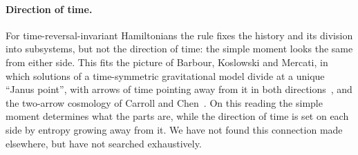 \documentclass[11pt]{article}
\theoremstyle{definition}
\theoremstyle{remark}
\begin{document}
\paragraph{Direction of time.} For time-reversal-invariant Hamiltonians the rule fixes the history and its division into subsystems, but not the direction of time: the simple moment looks the same from either side. This fits the picture of Barbour, Koslowski and Mercati, in which solutions of a time-symmetric gravitational model divide at a unique ``Janus point'', with arrows of time pointing away from it in both directions~\cite{BKM2014}, and the two-arrow cosmology of Carroll and Chen~\cite{CarrollChen2004}. On this reading the simple moment determines what the parts are, while the direction of time is set on each side by entropy growing away from it. We have not found this connection made elsewhere, but have not searched exhaustively.
\end{document}
